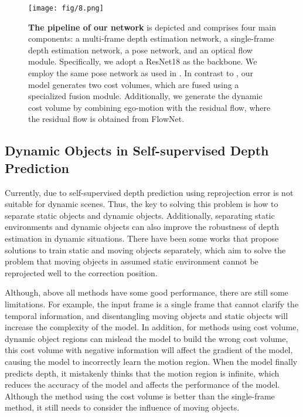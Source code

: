 \documentclass[journal]{IEEEtran}
\begin{document}
\begin{figure*}
  \centering
   \texttt{[image: fig/8.png]}
   \caption{\textbf{The pipeline of our network} is depicted and comprises four main components: a multi-frame depth estimation network, a single-frame depth estimation network, a pose network, and an optical flow module. Specifically, we adopt a ResNet18 \cite{he2016deep} as the backbone. We employ the same pose network as used in \cite{monodepth2}. In contrast to \cite{manydepth}, our model generates two cost volumes, which are fused using a specialized fusion module. Additionally, we generate the dynamic cost volume by combining ego-motion with the residual flow, where the residual flow is obtained from FlowNet\cite{yin2018geonet}.}
   \label{fig:4}
\end{figure*}

\subsection{Dynamic Objects in Self-supervised Depth Prediction}
Currently, due to self-supervised depth prediction using reprojection error is not suitable for dynamic scenes. Thus, the key to solving this problem is how to separate static objects and dynamic objects. Additionally, separating static environments and dynamic objects can also improve the robustness of depth estimation in dynamic situations. There have been some works\cite{gordon2019depth,manydepth,feng2022disentangling,wimbauer2021monorec,klingner2020self,lee2021learning,lee2021attentive} that propose solutions to train static and moving objects separately, which aim to solve the problem that moving objects in assumed static environment cannot be reprojected well to the correction position. 

Although, above all methods have some good performance, there are still some limitations. For example, the input frame is a single frame that cannot clarify the temporal information, and disentangling moving objects and static objects will increase the complexity of the model.  In addition, for methods using cost volume, dynamic object regions can mislead the model to build the wrong cost volume, this cost volume with negative information will affect the gradient of the model, causing the model to incorrectly learn the motion region. When the model finally predicts depth, it mistakenly thinks that the motion region is infinite, which reduces the accuracy of the model and affects the performance of the model. Although the method using the cost volume is better than the single-frame method, it still needs to consider the influence of moving objects. 
\end{document}
